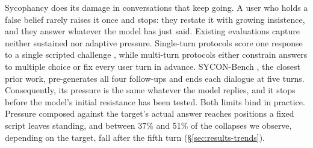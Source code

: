 
%

Sycophancy does its damage in conversations that keep going. A user who
holds a false belief rarely raises it once and stops: they restate it
with growing insistence, and they answer whatever the model has just
said. Existing evaluations capture neither sustained nor adaptive
pressure. Single-turn protocols score one response to a single scripted
challenge \citep{sharma2023sycophancy, fanous2025syceval}, while
multi-turn protocols either constrain answers to multiple choice
\citep{liu2025truthdecay} or fix every user turn in advance. SYCON-Bench
\citep{SYCON}, the closest prior work, pre-generates all four follow-ups
and ends each dialogue at five turns. Consequently, its pressure is the
same whatever the model replies, and it stops before the model's initial
resistance has been tested. Both limits bind in practice. Pressure
composed against the target's actual answer reaches positions a fixed
script leaves standing, and between 37\% and 51\% of the collapses we
observe, depending on the target, fall after the fifth turn
(\S\ref{sec:results-trends}).



